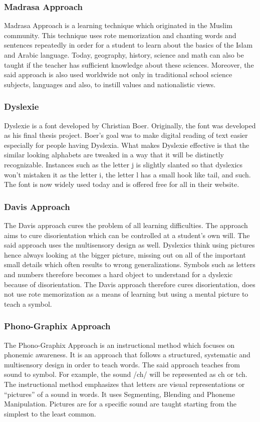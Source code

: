 \documentclass[letterpaper, 12pt, oneside]{book}
\begin{document}
\subsubsection{Madrasa Approach}
Madrasa Approach is a learning technique which originated in the Muslim community. This technique uses rote memorization and chanting words and sentences repeatedly in order for a student to learn about the basics of the Islam and Arabic language. Today, geography, history, science and math can also  be taught if the teacher has sufficient knowledge about these sciences. Moreover, the said approach is also used worldwide not only in traditional school science subjects, languages and also, to instill values and nationalistic views.

\subsubsection{Dyslexie}
Dyslexie is a font developed by Christian Boer. Originally, the font was developed as his final thesis project. Boer’s goal was to make digital reading of text easier especially for people having Dyslexia. What makes Dyslexie effective is that the similar looking alphabets are tweaked in a way that it will be distinctly recognizable. Instances such as the letter j is slightly slanted so that dyslexics won’t mistaken it as the letter i, the letter l has a small hook like tail, and such. The font is now widely used today and is offered free for all in their website.

\subsubsection{Davis Approach}
The Davis approach cures the problem of all learning difficulties. The approach aims to cure disorientation which can be controlled at a student’s own will. The said approach uses the multisensory design as well. Dyslexics think using pictures hence always looking at the bigger picture, missing out on all of  the important small details which often results to wrong generalizations. Symbols such as letters and numbers therefore becomes a hard object to understand for a dyslexic because of disorientation. The Davis approach therefore cures disorientation, does not use rote memorization as a means of learning but using a mental picture to teach a symbol. 

\subsubsection{Phono-Graphix Approach}
The Phono-Graphix Approach is an instructional method which focuses on phonemic awareness. It is an approach that follows a structured, systematic and multisensory design in order to teach words. The said approach teaches from sound to symbol. For example, the sound /ch/ will be represented as ch or tch. The instructional method emphasizes that letters are visual representations or “pictures” of a sound in words. It uses Segmenting, Blending and Phoneme Manipulation. Pictures are for a specific sound are taught starting from the simplest to the least common. 
\end{document}
